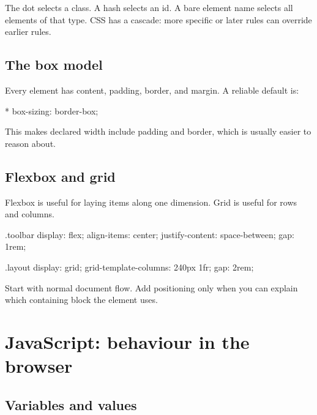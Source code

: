\documentclass[11pt,openany,oneside]{book}
\begin{document}

The dot selects a class. A hash selects an id. A bare element name selects all elements of that type. CSS has a cascade: more specific or later rules can override earlier rules.

\section{The box model}

Every element has content, padding, border, and margin. A reliable default is:

\begin{code}[language=CSS3]
* {
  box-sizing: border-box;
}
\end{code}

This makes declared width include padding and border, which is usually easier to reason about.

\section{Flexbox and grid}

Flexbox is useful for laying items along one dimension. Grid is useful for rows and columns.

\begin{code}[language=CSS3]
.toolbar {
  display: flex;
  align-items: center;
  justify-content: space-between;
  gap: 1rem;
}

.layout {
  display: grid;
  grid-template-columns: 240px 1fr;
  gap: 2rem;
}
\end{code}

Start with normal document flow. Add positioning only when you can explain which containing block the element uses.

\chapter{JavaScript: behaviour in the browser}

\section{Variables and values}
\end{document}
